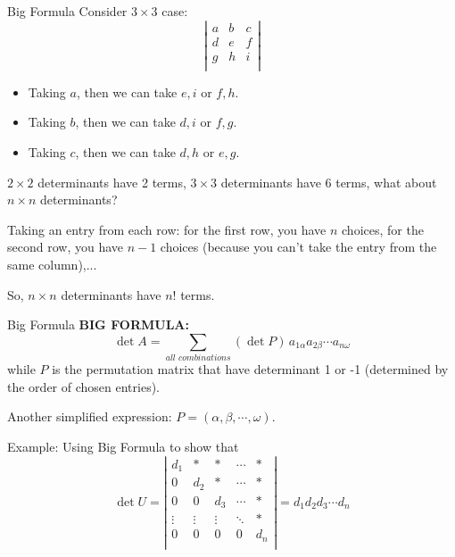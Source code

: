 \documentclass{beamer}
\begin{document}
\begin{frame}{Big Formula}
Consider $3\times 3$ case:
\begin{equation*}
    \left| \begin{matrix}
        a&		b&		c\\
        d&		e&		f\\
        g&		h&		i\\
    \end{matrix} \right|
\end{equation*}
\begin{itemize}
    \item Taking $a$, then we can take $e, i$ or $f, h$.
    \item Taking $b$, then we can take $d, i$ or $f, g$.
    \item Taking $c$, then we can take $d, h$ or $e, g$.
\end{itemize}

$2\times 2$ determinants have 2 terms, $3\times 3$ determinants have 6 terms, what about $n\times n$ determinants?

\vspace{3pt}
Taking an entry from each row: for the first row, you have $n$ choices, for the second row, you have $n-1$ choices (because you can't take the entry from the same column),...

\vspace{3pt}
So, $n\times n$ determinants have $n!$ terms.
\end{frame}

\begin{frame}{Big Formula}
\textbf{BIG FORMULA:}
\begin{equation*}
    \det A=\sum_{all\,\,combinations}{\left( \det P \right)}\,a_{1\alpha}a_{2\beta}\cdots a_{n\omega}
\end{equation*}
while $P$ is the permutation matrix that have determinant 1 or -1 (determined by the order of chosen entries).

\vspace{3pt}
Another simplified expression: $P=\left( \alpha ,\beta ,\cdots ,\omega \right)$.

\vspace{3pt}
Example: Using Big Formula to show that
\begin{equation*}
    \det U=\left| \begin{matrix}
        d_1&		\ast&		\ast&		\cdots&		\ast\\
        0&		d_2&		\ast&		\cdots&		\ast\\
        0&		0&		d_3&		\cdots&		\ast\\
        \vdots&		\vdots&		\vdots&		\ddots&		\ast\\
        0&		0&		0&		0&		d_n\\
    \end{matrix} \right|=d_1d_2d_3\cdots d_n
\end{equation*}
\end{frame}
\end{document}
